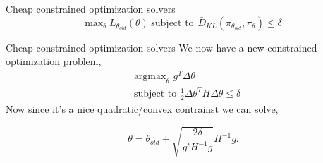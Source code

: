 \documentclass{beamer}
\begin{document}
\begin{frame}{Cheap constrained optimization solvers}
    \begin{equation*}
                \text{max}_{\theta} \hspace{3pt} L_{\theta_{old}}(\theta) \hspace{3pt} 
                 \text{subject to }  \hspace{1pt} \bar{D}_{KL}\left(\pi_{\theta_{old}}, \pi_\theta \right) \leq \delta
        \end{equation*}
    
\end{frame}

\begin{frame}{Cheap constrained optimization solvers}
    We now have a new constrained optimization problem, 
    \begin{align*}
        & \text{argmax}_{\theta}\hspace{4pt} g^T \Delta\theta   \\
        & \text{subject to  } \frac{1}{2}\Delta\theta ^TH\Delta\theta \leq \delta
    \end{align*}
Now since it's a nice quadratic/convex contrainst we can solve, 

\begin{equation*}
    \theta = \theta_{old} + \sqrt{\frac{2\delta}{g^tH^{-1}g}} H^{-1}g. 
\end{equation*}
\hyperlink{done_deriv}{}
\end{frame}
\end{document}
